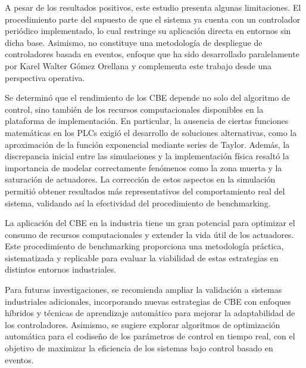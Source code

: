 \documentclass[conference]{IEEEtran}
\begin{document}
A pesar de los resultados positivos, este estudio presenta algunas limitaciones. El procedimiento parte del supuesto de que el sistema ya cuenta con un controlador periódico implementado, lo cual restringe su aplicación directa en entornos sin dicha base. Asimismo, no constituye una metodología de despliegue de controladores basada en eventos, enfoque que ha sido desarrollado paralelamente por Karel Walter Gómez Orellana y complementa este trabajo desde una perspectiva operativa.

Se determinó que el rendimiento de los CBE depende no solo del algoritmo de control, sino también de los recursos computacionales disponibles en la plataforma de implementación. En particular, la ausencia de ciertas funciones matemáticas en los PLCs exigió el desarrollo de soluciones alternativas, como la aproximación de la función exponencial mediante series de Taylor. Además, la discrepancia inicial entre las simulaciones y la implementación física resaltó la importancia de modelar correctamente fenómenos como la zona muerta y la saturación de actuadores. La corrección de estos aspectos en la simulación permitió obtener resultados más representativos del comportamiento real del sistema, validando así la efectividad del procedimiento de benchmarking.

La aplicación del CBE en la industria tiene un gran potencial para optimizar el consumo de recursos computacionales y extender la vida útil de los actuadores. Este procedimiento de benchmarking proporciona una metodología práctica, sistematizada y replicable para evaluar la viabilidad de estas estrategias en distintos entornos industriales.

Para futuras investigaciones, se recomienda ampliar la validación a sistemas industriales adicionales, incorporando nuevas estrategias de CBE con enfoques híbridos y técnicas de aprendizaje automático para mejorar la adaptabilidad de los controladores. Asimismo, se sugiere explorar algoritmos de optimización automática para el codiseño de los parámetros de control en tiempo real, con el objetivo de maximizar la eficiencia de los sistemas bajo control basado en eventos.
\end{document}
